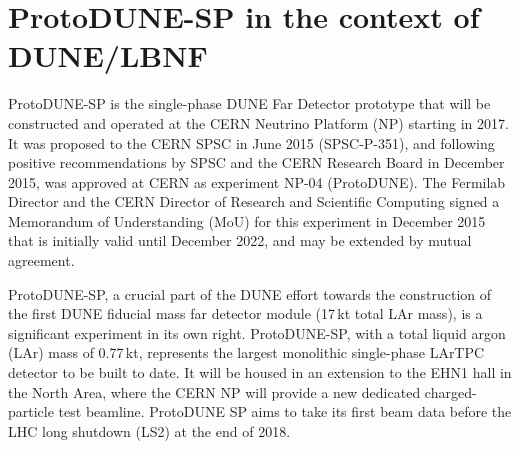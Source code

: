 



\section{ProtoDUNE-SP in the context of DUNE/LBNF}

ProtoDUNE-SP is the single-phase DUNE Far Detector prototype that will be constructed and operated at the CERN Neutrino Platform (NP) starting in 2017. It was proposed to the CERN SPSC in June 2015 (SPSC-P-351), and following positive recommendations by SPSC and the CERN Research Board in December 2015, was approved at CERN as experiment NP-04 (ProtoDUNE). The Fermilab Director and the CERN Director of Research and Scientific Computing signed a Memorandum of Understanding (MoU) for this experiment in December 2015 that is initially valid until December 2022, %
and may be extended by mutual agreement. 



ProtoDUNE-SP, a crucial part of the DUNE effort towards the construction of the first DUNE  fiducial mass far detector module (17\,kt total LAr mass), is a significant experiment in its own right. ProtoDUNE-SP, with a total liquid argon (LAr) mass of 0.77\,kt, represents the largest monolithic single-phase LArTPC detector to be built to date. %
It will be housed in an extension to the EHN1 hall in the North Area, where the CERN NP will provide a new dedicated charged-particle test beamline. ProtoDUNE SP aims to take its first beam data before the LHC long shutdown (LS2) at the end of 2018.


